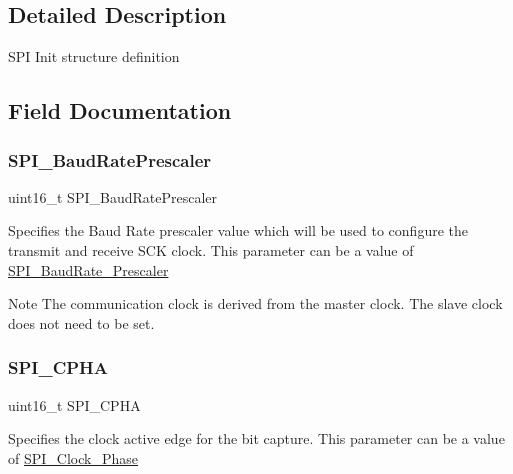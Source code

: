 \subsection{Detailed Description}
S\+PI Init structure definition ~\newline
 

\subsection{Field Documentation}
\mbox{\label{struct_s_p_i___init_type_def_a35b348a0ba5d3e9a8bc907a7ebe10d13}} 
\subsubsection{\texorpdfstring{S\+P\+I\+\_\+\+Baud\+Rate\+Prescaler}{SPI\_BaudRatePrescaler}}
{\footnotesize\ttfamily uint16\+\_\+t S\+P\+I\+\_\+\+Baud\+Rate\+Prescaler}

Specifies the Baud Rate prescaler value which will be used to configure the transmit and receive S\+CK clock. This parameter can be a value of \mbox{\hyperlink{group___s_p_i___baud_rate___prescaler}{S\+P\+I\+\_\+\+Baud\+Rate\+\_\+\+Prescaler}} \begin{DoxyNote}{Note}
The communication clock is derived from the master clock. The slave clock does not need to be set. 
\end{DoxyNote}
\mbox{\label{struct_s_p_i___init_type_def_a120f808113ce7d69e2ec1ea65abed627}} 
\subsubsection{\texorpdfstring{S\+P\+I\+\_\+\+C\+P\+HA}{SPI\_CPHA}}
{\footnotesize\ttfamily uint16\+\_\+t S\+P\+I\+\_\+\+C\+P\+HA}

Specifies the clock active edge for the bit capture. This parameter can be a value of \mbox{\hyperlink{group___s_p_i___clock___phase}{S\+P\+I\+\_\+\+Clock\+\_\+\+Phase}} \mbox{\label{struct_s_p_i___init_type_def_ae8d27aca088402c07e34e5a2ab4902d9}} 
